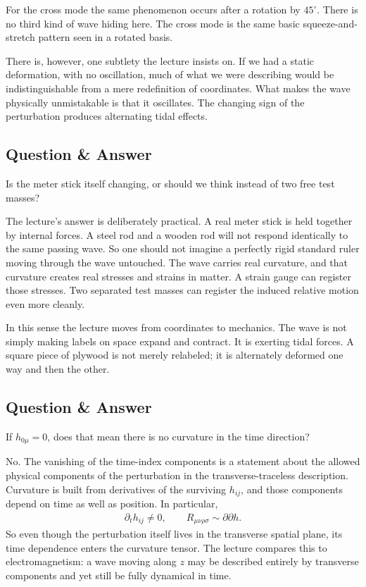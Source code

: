 For the cross mode the same phenomenon occurs after a rotation by \(45^\circ\). There is no third kind of wave hiding here. The cross mode is the same basic squeeze-and-stretch pattern seen in a rotated basis.

There is, however, one subtlety the lecture insists on. If we had a static deformation, with no oscillation, much of what we were describing would be indistinguishable from a mere redefinition of coordinates. What makes the wave physically unmistakable is that it oscillates. The changing sign of the perturbation produces alternating tidal effects.

\subsection{Question \& Answer}

Is the meter stick itself changing, or should we think instead of two free test masses?

The lecture's answer is deliberately practical. A real meter stick is held together by internal forces. A steel rod and a wooden rod will not respond identically to the same passing wave. So one should not imagine a perfectly rigid standard ruler moving through the wave untouched. The wave carries real curvature, and that curvature creates real stresses and strains in matter. A strain gauge can register those stresses. Two separated test masses can register the induced relative motion even more cleanly.

In this sense the lecture moves from coordinates to mechanics. The wave is not simply making labels on space expand and contract. It is exerting tidal forces. A square piece of plywood is not merely relabeled; it is alternately deformed one way and then the other.

\subsection{Question \& Answer}

If \(h_{0\mu}=0\), does that mean there is no curvature in the time direction?

No. The vanishing of the time-index components is a statement about the allowed physical components of the perturbation in the transverse-traceless description. Curvature is built from derivatives of the surviving \(h_{ij}\), and those components depend on time as well as position. In particular,
\begin{align}
\partial_t h_{ij}\neq 0,
\qquad
R_{\mu\nu\rho\sigma}\sim \partial\partial h.
\end{align}
So even though the perturbation itself lives in the transverse spatial plane, its time dependence enters the curvature tensor. The lecture compares this to electromagnetism: a wave moving along \(z\) may be described entirely by transverse components and yet still be fully dynamical in time.

